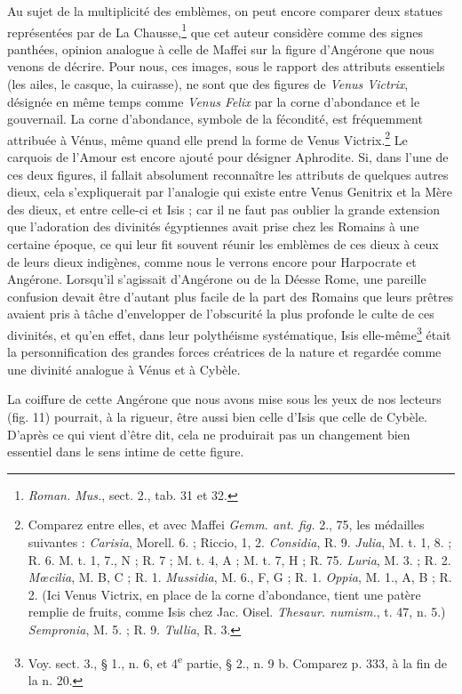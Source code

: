 \documentclass[a4paper, 11pt, oneside, polutonikogreek, french]{article}
\begin{document}
Au sujet de la multiplicité des emblèmes, on peut encore comparer deux statues représentées par de La Chausse,\footnote{\emph{Roman. Mus.}, sect. 2., tab. 31 et 32.} que cet auteur considère comme des signes panthées, opinion analogue à celle de Maffei sur la figure d'Angérone que nous venons de décrire. Pour nous, ces images, sous le rapport des attributs essentiels (les ailes, le casque, la cuirasse), ne sont que des figures de \emph{Venus Victrix}, désignée en même temps comme \emph{Venus Felix} par la corne d'abondance et le gouvernail. La corne d'abondance, symbole de la fécondité, est fréquemment attribuée à Vénus, même quand elle prend la forme de Venus Victrix.\footnote{Comparez entre elles, et avec Maffei \emph{Gemm. ant. fig.} 2., 75, les médailles suivantes : \emph{Carisia}, Morell. 6. ; Riccio, 1, 2. \emph{Considia}, R. 9. \emph{Julia}, M. t. 1, 8. ; R. 6. M. t. 1, 7., N ; R. 7 ; M. t. 4, A ; M. t. 7, H ; R. 75. \emph{Luria}, M. 3. ; R. 2. \emph{Mœcilia}, M. B, C ; R. 1. \emph{Mussidia}, M. 6., F, G ; R. 1. \emph{Oppia}, M. 1., A, B ; R. 2. (Ici Venus Victrix, en place de la corne d'abondance, tient une patère remplie de fruits, comme Isis chez Jac. Oisel. \emph{Thesaur. numism.}, t. 47, n. 5.) \emph{Sempronia}, M. 5. ; R. 9. \emph{Tullia}, R. 3.} Le carquois de l'Amour est encore ajouté pour désigner Aphrodite. Si, dans l'une de ces deux figures, il fallait absolument reconnaître les attributs de quelques autres dieux, cela s'expliquerait par l'analogie qui existe entre Venus Genitrix et la Mère des dieux, et entre celle-ci et Isis ; car il ne faut pas oublier la grande extension que l'adoration des divinités égyptiennes avait prise chez les Romains à une certaine époque, ce qui leur fit souvent réunir les emblèmes de ces dieux à ceux de leurs dieux indigènes, comme nous le verrons encore pour Harpocrate et Angérone. Lorsqu'il s'agissait d'Angérone ou de la Déesse Rome, une pareille confusion devait être d'autant plus facile de la part des Romains que leurs prêtres avaient pris à tâche d'envelopper de l'obscurité la plus profonde le culte de ces divinités, et qu'en effet, dans leur polythéisme systématique, Isis elle-même\footnote{Voy. sect. 3., § 1., n. 6, et 4\textsuperscript{e} partie, § 2., n. 9 b. Comparez p. 333, à la fin de la n. 20.} était la personnification des grandes forces créatrices de la nature et regardée comme une divinité analogue à Vénus et à Cybèle.

La coiffure de cette Angérone que nous avons mise sous les yeux de nos lecteurs (fig. 11) pourrait, à la rigueur, être aussi bien celle d'Isis que celle de Cybèle. D'après ce qui vient d'être dit, cela ne produirait pas un changement bien essentiel dans le sens intime de cette figure.
\end{document}
